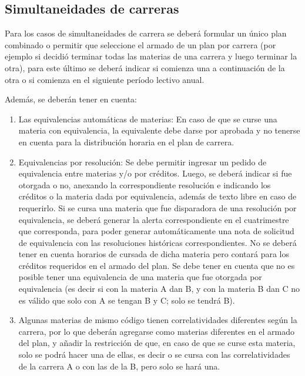 \documentclass[a4paper]{article}
\begin{document}
\subsection{Simultaneidades de carreras}

Para los casos de simultaneidades de carrera se deberá formular un único plan combinado o permitir que seleccione el armado de un plan por carrera (por ejemplo si decidió terminar todas las materias de una carrera y luego terminar la otra), para este último se deberá indicar si comienza una a continuación de la otra o si comienza en el siguiente período lectivo anual.

Además, se deberán tener en cuenta: 

\begin{enumerate}
	\item Las equivalencias automáticas de materias: En caso de que se curse una materia con equivalencia, la equivalente debe darse por aprobada y no tenerse en cuenta para la distribución horaria en el plan de carrera.
	
	\item Equivalencias por resolución: Se debe permitir ingresar un pedido de equivalencia entre materias y/o por créditos. Luego, se deberá indicar si fue otorgada o no, anexando la correspondiente resolución e indicando los créditos o la materia dada por equivalencia, además de texto libre en caso de requerirlo.
	Si se cursa una materia que fue disparadora de una resolución por equivalencia, se deberá generar la alerta correspondiente en el cuatrimestre que corresponda, para poder generar automáticamente una nota de solicitud de equivalencia con las resoluciones históricas correspondientes. No se deberá tener en cuenta horarios de cursada de dicha materia pero contará para los créditos requeridos en el armado del plan.
	Se debe tener en cuenta que no es posible tener una equivalencia de una materia que fue otorgada por equivalencia (es decir si con la materia A dan B, y con la materia B dan C no es válido que solo con A se tengan B y C; solo se tendrá B).
	
	\item Algunas materias de mismo código tienen correlatividades diferentes según la carrera, por lo que deberán agregarse como materias diferentes en el armado del plan, y añadir la restricción de que, en caso de que se curse esta materia, solo se podrá hacer una de ellas, es decir o se cursa con las correlatividades de la carrera A o con las de la B, pero solo se hará una.
\end{enumerate}
\end{document}
